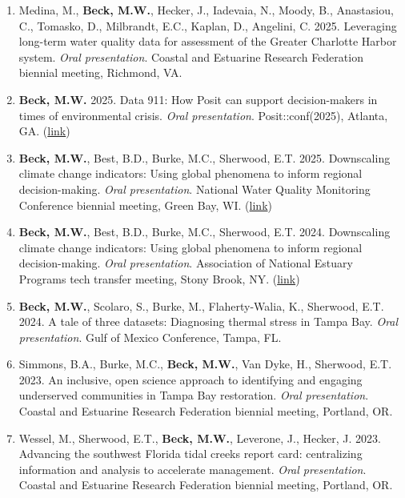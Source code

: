 \documentclass[letterpaper,12pt]{article}
\begin{document}
\begin{enumerate}

\item Medina, M., \textbf{Beck, M.W.}, Hecker, J., Iadevaia, N., Moody, B., Anastasiou, C., Tomasko, D., Milbrandt, E.C., Kaplan, D., Angelini, C. 2025. Leveraging long-term water quality data for assessment of the Greater Charlotte Harbor system. \textit{Oral presentation}. Coastal and Estuarine Research Federation biennial meeting, Richmond, VA. 
    
\item {\bf Beck, M.W.} 2025. Data 911: How Posit can support decision-makers in times of environmental crisis. \textit{Oral presentation}. Posit::conf(2025), Atlanta, GA. ({\footnotesize\href{https://docs.google.com/presentation/d/1YbIg30Jl_tglag10_retKKTet-i524yyAJDW6rAHL8Q/edit?usp=sharing}{link}})

\item {\bf Beck, M.W.}, Best, B.D., Burke, M.C., Sherwood, E.T. 2025. Downscaling climate change indicators: Using global phenomena to inform regional decision-making. \textit{Oral presentation}. National Water Quality Monitoring Conference biennial meeting, Green Bay, WI. ({\footnotesize\href{https://docs.google.com/presentation/d/1LCdSZplNNUcMLxklvXwFyxERZxC1FQXQUUeaQYKVQGg/edit?usp=sharing}{link}})

\item {\bf Beck, M.W.}, Best, B.D., Burke, M.C., Sherwood, E.T. 2024. Downscaling climate change indicators: Using global phenomena to inform regional decision-making. \textit{Oral presentation}. Association of National Estuary Programs tech transfer meeting, Stony Brook, NY. ({\footnotesize\href{https://docs.google.com/presentation/d/11OzGf77IC23zaym3fjGzZFMLT596yeq4kFjHLQ0ljEA/edit?usp=sharing}{link}})

\item {\bf Beck, M.W.}, Scolaro, S., Burke, M., Flaherty-Walia, K., Sherwood, E.T. 2024. A tale of three datasets: Diagnosing thermal stress in Tampa Bay. \textit{Oral presentation}. Gulf of Mexico Conference, Tampa, FL.

\item Simmons, B.A., Burke, M.C., {\bf Beck, M.W.}, Van Dyke, H., Sherwood, E.T. 2023. An inclusive, open science approach to identifying and engaging underserved communities in Tampa Bay restoration. \textit{Oral presentation}. Coastal and Estuarine Research Federation biennial meeting, Portland, OR. 

\item Wessel, M., Sherwood, E.T., {\bf Beck, M.W.}, Leverone, J., Hecker, J. 2023. Advancing the southwest Florida tidal creeks report card: centralizing information and analysis to accelerate management. \textit{Oral presentation}. Coastal and Estuarine Research Federation biennial meeting, Portland, OR. 


\end{enumerate}
\end{document}
